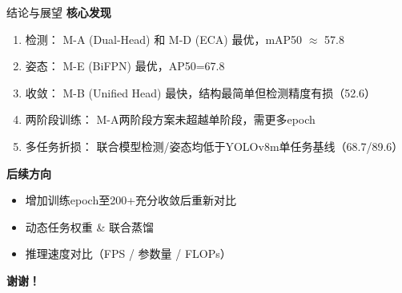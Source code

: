 \documentclass[aspectratio=169, 10pt]{ctexbeamer}
\begin{document}
\begin{frame}{结论与展望}
  \textbf{核心发现}
  \begin{enumerate}\setlength{\itemsep}{3pt}
    \item \alert{检测：} M-A (Dual-Head) 和 M-D (ECA) 最优，mAP50 $\approx$ 57.8
    \item \alert{姿态：} M-E (BiFPN) 最优，AP50=67.8
    \item \alert{收敛：} M-B (Unified Head) 最快，结构最简单但检测精度有损（52.6）
    \item \alert{两阶段训练：} M-A两阶段方案未超越单阶段，需更多epoch
    \item \alert{多任务折损：} 联合模型检测/姿态均低于YOLOv8m单任务基线（68.7/89.6）
  \end{enumerate}

  \vspace{0.2cm}
  \textbf{后续方向}
  \begin{itemize}\setlength{\itemsep}{2pt}
    \item 增加训练epoch至200+充分收敛后重新对比
    \item 动态任务权重 \& 联合蒸馏
    \item 推理速度对比（FPS / 参数量 / FLOPs）
  \end{itemize}

  \vspace{0.3cm}
  \centering \Large \textbf{谢谢！}
\end{frame}
\end{document}
